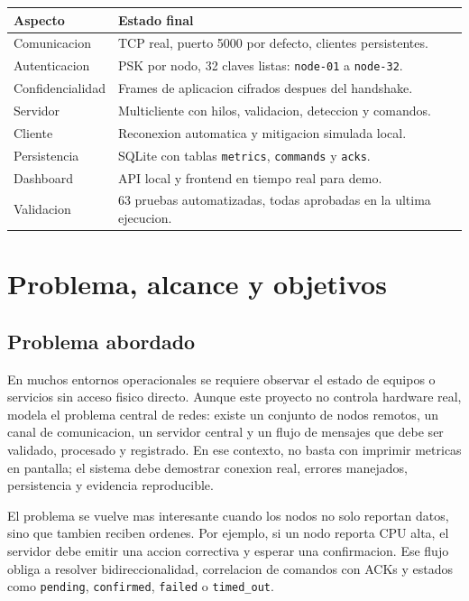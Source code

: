 \documentclass[11pt,letterpaper]{article}
\begin{document}
\begin{longtable}{|p{}|p{}|}
\hline
\textbf{Aspecto} & \textbf{Estado final} \\
\hline
Comunicacion & TCP real, puerto 5000 por defecto, clientes persistentes. \\
\hline
Autenticacion & PSK por nodo, 32 claves listas: \texttt{node-01} a \texttt{node-32}. \\
\hline
Confidencialidad & Frames de aplicacion cifrados despues del handshake. \\
\hline
Servidor & Multicliente con hilos, validacion, deteccion y comandos. \\
\hline
Cliente & Reconexion automatica y mitigacion simulada local. \\
\hline
Persistencia & SQLite con tablas \texttt{metrics}, \texttt{commands} y \texttt{acks}. \\
\hline
Dashboard & API local y frontend en tiempo real para demo. \\
\hline
Validacion & 63 pruebas automatizadas, todas aprobadas en la ultima ejecucion. \\
\hline
\end{longtable}

\newpage
\section{Problema, alcance y objetivos}

\subsection{Problema abordado}

En muchos entornos operacionales se requiere observar el estado de equipos o
servicios sin acceso fisico directo. Aunque este proyecto no controla hardware
real, modela el problema central de redes: existe un conjunto de nodos remotos,
un canal de comunicacion, un servidor central y un flujo de mensajes que debe ser
validado, procesado y registrado. En ese contexto, no basta con imprimir metricas
en pantalla; el sistema debe demostrar conexion real, errores manejados,
persistencia y evidencia reproducible.

El problema se vuelve mas interesante cuando los nodos no solo reportan datos,
sino que tambien reciben ordenes. Por ejemplo, si un nodo reporta CPU alta, el
servidor debe emitir una accion correctiva y esperar una confirmacion. Ese flujo
obliga a resolver bidireccionalidad, correlacion de comandos con ACKs y estados
como \texttt{pending}, \texttt{confirmed}, \texttt{failed} o \texttt{timed\_out}.
\end{document}
